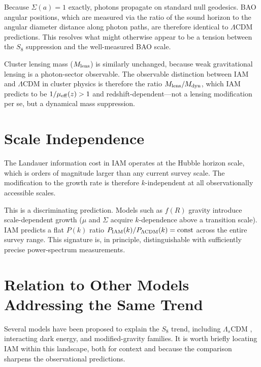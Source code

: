 \documentclass[12pt,a4paper]{article}
\begin{document}
Because $\Sigma(a) = 1$ exactly, photons propagate on standard null geodesics.
BAO angular positions, which are measured via the ratio of the sound horizon
to the angular diameter distance along photon paths, are therefore identical to
$\Lambda$CDM predictions.  This resolves what might otherwise appear to be a
tension between the $S_8$ suppression and the well-measured BAO scale.

Cluster lensing mass ($M_{\rm lens}$) is similarly unchanged, because weak
gravitational lensing is a photon-sector observable.
The observable distinction between IAM and $\Lambda$CDM in cluster physics
is therefore the ratio $M_{\rm lens}/M_{\rm dyn}$, which IAM predicts to
be $1/\mu_{\rm eff}(z) > 1$ and redshift-dependent---not a lensing
modification per se, but a dynamical mass suppression.

\section{Scale Independence}

The Landauer information cost in IAM operates at the Hubble horizon scale,
which is orders of magnitude larger than any current survey scale.
The modification to the growth rate is therefore $k$-independent at
all observationally accessible scales.

This is a discriminating prediction.  Models such as $f(R)$ gravity introduce
scale-dependent growth ($\mu$ and $\Sigma$ acquire $k$-dependence above a
transition scale).  IAM predicts a flat $P(k)$ ratio
$P_{\rm IAM}(k)/P_{\Lambda\rm CDM}(k) = \mathrm{const}$ across the
entire survey range.  This signature is, in principle, distinguishable with
sufficiently precise power-spectrum measurements.

\section{Relation to Other Models Addressing the Same Trend}

Several models have been proposed to explain the $S_8$ trend, including
$\Lambda_s$CDM \citep{Akarsu2023}, interacting dark energy, and
modified-gravity families.  It is worth briefly locating IAM within this
landscape, both for context and because the comparison sharpens the
observational predictions.
\end{document}
